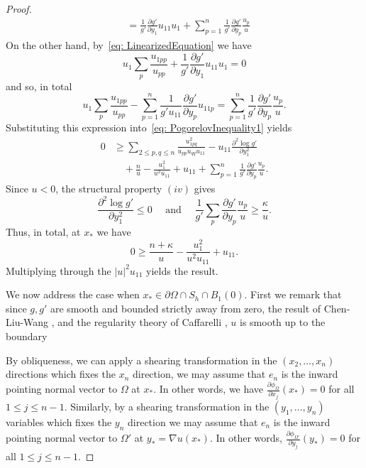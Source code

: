 \documentclass[12pt,reqno]{amsart}
\newcommand{\del}{\partial}
\numberwithin{equation}{section}
\begin{document}
\begin{proof}
\[\begin{aligned}
&= \frac{1}{g'}\frac{\del g'}{\del y_1}u_{11}u_1 +\sum_{p=1}^{n}\frac{1}{g'}\frac{\del g'}{\del y_p}\frac{u_{p}}{u}
\end{aligned}
\]
On the other hand, by~\eqref{eq: LinearizedEquation} we have
\[
u_1\sum_p \frac{u_{1pp}}{u_{pp}}  + \frac{1}{g'}\frac{\del g'}{\del y_1}u_{11}u_1 = 0
\]
and so, in total
\[
u_1\sum_p \frac{u_{1pp}}{u_{pp}}-\sum_{p=1}^{n}\frac{1}{g'u_{11}}\frac{\del g'}{\del y_p}u_{11p}=\sum_{p=1}^{n}\frac{1}{g'}\frac{\del g'}{\del y_p}\frac{u_{p}}{u}.
\]
Substituting this expression into~\eqref{eq: PogorelovInequality1} yields
\begin{equation}
\begin{aligned}
0 &\geq \sum_{2 \leq p,q\leq n}\frac{u_{1pq}^2} {u_{pp}u_{qq}u_{11}}-u_{11}\frac{\del^2 \log g'}{\del y_1^2}  \\
  &\quad + \frac{n}{u} -\frac{u_1^2}{u^2u_{11}} + u_{11}+\sum_{p=1}^{n}\frac{1}{g'}\frac{\del g'}{\del y_p}\frac{u_{p}}{u}.
  \end{aligned}
\end{equation}
Since $u<0$, the structural property $(iv)$ gives
\[
\frac{\del^2 \log g'}{\del y_1^2} \leq 0 \quad \text{ and } \quad \frac{1}{g'}\sum_p\frac{\del g'}{\del y_p}\frac{u_{p}}{u} \geq \frac{\kappa}{u}.
\]
 Thus, in total, at $x_*$ we have
 \[
 0 \geq \frac{n+\kappa}{u} -\frac{u_1^2}{u^2u_{11}} + u_{11}.
 \]
 Multiplying through the $|u|^2u_{11}$ yields the result.

 We now address the case when $x_* \in \del\Omega \cap S_h \cap B_1(0)$.  First we remark that since $g,g'$ are smooth and bounded strictly away from zero, the result of Chen-Liu-Wang \cite{Chen-Liu-Wang}, and the regularity theory of Caffarelli \cite{Caffarelli2, Caffarelli3}, $u$ is smooth up to the boundary 
 
 By obliqueness, we can apply a shearing transformation in the $(x_2,\ldots,x_{n})$ directions which fixes the $x_n$ direction, we may assume that $e_n$ is the inward pointing normal vector to $\Omega$ at $x_*$.  In other words, we have $\frac{\del \phi_{\Omega}}{\del x_j}(x_*)=0$ for all $1 \leq j \leq n-1$.  Similarly, by a shearing transformation in the $(y_1,\ldots,y_n)$ variables which fixes the $y_n$ direction we may assume that  $e_n$ is the inward pointing normal vector to $\Omega'$ at $y_*=\nabla u(x_*)$.  In other words, $\frac{\del \phi_{\Omega'}}{\del y_j}(y_*)=0$ for all $1 \leq j \leq n-1$. 
 

\end{proof}
\end{document}
